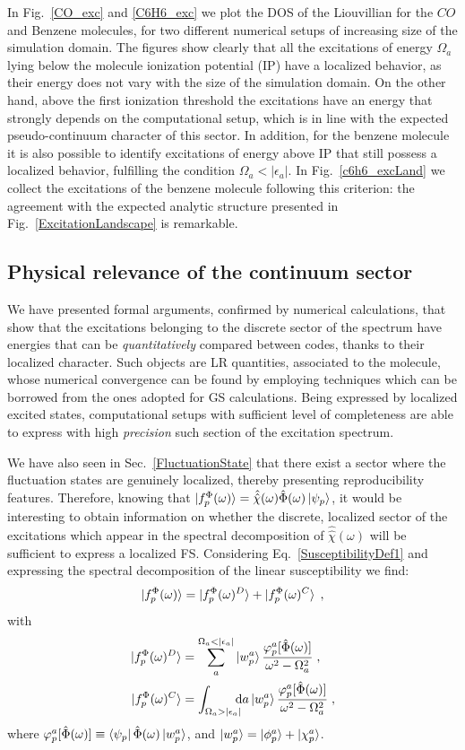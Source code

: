 \documentclass[reprint,aps,prb]{revtex4-1}
\newcommand{\dd}{{\rm d}}
\newcommand{\eps}{\epsilon}
\newcommand{\be}{\begin{equation}}
\newcommand{\ee}{\end{equation}}
\newcommand{\nn}{\notag}
\newcommand{\lb}{\label}
\newcommand{\op}[1]{\hat {#1}}
\newcommand{\sop}[1]{\op{\op {#1}}}
\newcommand{\fscd}[1]{\ket{f_p^\Phi(\omega)^{#1}}}
\begin{document}
In Fig.~\ref{CO_exc} and \ref{C6H6_exc} we plot the DOS of the Liouvillian for the $CO$  and Benzene molecules, 
for two different numerical setups of increasing size of the simulation domain. 
The figures show clearly that all the excitations of energy $\Omega_a$ lying below the 
molecule ionization potential (IP) have a localized behavior, as their energy does not vary with the size of the simulation domain.
On the other hand, above the first ionization threshold the excitations have an energy that strongly depends on the computational
setup, which is in line with the expected pseudo-continuum character of this sector. 
In addition, for the benzene molecule it is also possible to 
identify excitations of energy above IP that still possess a localized behavior, fulfilling the condition $\Omega_a < |\eps_a|$.
In Fig.~\ref{c6h6_excLand} we collect the excitations of the benzene molecule following this criterion:
the agreement with the expected analytic structure presented in Fig.~\ref{ExcitationLandscape} is remarkable.

\subsection{Physical relevance of the continuum sector}

We have presented formal arguments, confirmed by numerical calculations, that show that 
the excitations belonging to the discrete sector of the spectrum have energies
that can be \emph{quantitatively} compared between codes, thanks to their
localized character. 
Such objects are LR quantities, associated to the molecule, whose numerical convergence
can be found by employing techniques which can be borrowed from the ones adopted for GS calculations. Being expressed by localized excited states,
computational setups with sufficient level of completeness are able to
express with high \emph{precision} such section of the excitation spectrum.

We have also seen in Sec.~\ref{FluctuationState} that
there exist a sector where the fluctuation states are genuinely localized, thereby presenting reproducibility features. Therefore, 
knowing that $\ket{f_p^\Phi(\omega)} =\sop \chi(\omega) \op \Phi(\omega) \ket{\psi_p}$,
it would be interesting to obtain information on whether the discrete, localized sector of the excitations which appear in the spectral decomposition of $\sop \chi(\omega)$
will be sufficient to express a localized FS.
Considering Eq.~\eqref{SusceptibilityDef1} and
expressing the spectral decomposition of the linear susceptibility we find:
\be
\ket{f_p^\Phi(\omega)} = \fscd{D} + \fscd{C}
\lb{FSExcitationDef1} \;,
\ee
with
\begin{align}
 \fscd{D} &= \sum_a^{\Omega_a < |\eps_a|} \ket{w_p^a} \frac{\varphi_p^a[\op \Phi(\omega)]}{\omega^2-\Omega_a^2} \;, \nn \\
 \fscd{C}
 &= \int_{\Omega_a > |\eps_a|} \!\!\!\!\dd a \ket{w_p^a} \frac{\varphi_p^a[\op \Phi(\omega)]}{\omega^2-\Omega_a^2} \;, \nn
\end{align}
where $\varphi_p^a[\op \Phi(\omega)] \equiv \bra{\psi_p}\op\Phi(\omega)\ket{w_p^a}$,
and $\ket{w_p^a}=\ket{\phi_p^a}+\ket{\chi_p^a}$. 
\end{document}
